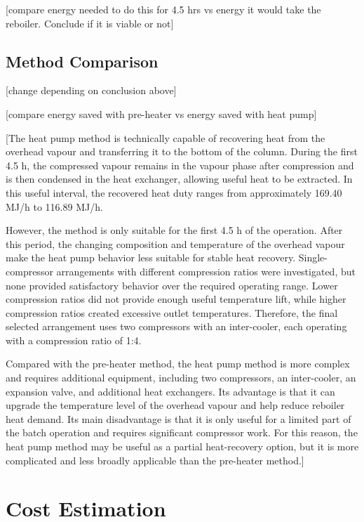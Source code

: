 {[}compare energy needed to do this for 4.5 hrs vs energy it would take
the reboiler. Conclude if it is viable or not{]}

\section{Method Comparison}\label{method-comparison}

{[}change depending on conclusion above{]}

{[}compare energy saved with pre-heater vs energy saved with heat
pump{]}

{[}The heat pump method is technically capable of recovering heat from
the overhead vapour and transferring it to the bottom of the column.
During the first 4.5 h, the compressed vapour remains in the vapour
phase after compression and is then condensed in the heat exchanger,
allowing useful heat to be extracted. In this useful interval, the
recovered heat duty ranges from approximately 169.40 MJ/h to 116.89
MJ/h.

However, the method is only suitable for the first 4.5 h of the
operation. After this period, the changing composition and temperature
of the overhead vapour make the heat pump behavior less suitable for
stable heat recovery. Single-compressor arrangements with different
compression ratios were investigated, but none provided satisfactory
behavior over the required operating range. Lower compression ratios did
not provide enough useful temperature lift, while higher compression
ratios created excessive outlet temperatures. Therefore, the final
selected arrangement uses two compressors with an inter-cooler, each
operating with a compression ratio of 1:4.

Compared with the pre-heater method, the heat pump method is more
complex and requires additional equipment, including two compressors, an
inter-cooler, an expansion valve, and additional heat exchangers. Its
advantage is that it can upgrade the temperature level of the overhead
vapour and help reduce reboiler heat demand. Its main disadvantage is
that it is only useful for a limited part of the batch operation and
requires significant compressor work. For this reason, the heat pump
method may be useful as a partial heat-recovery option, but it is more
complicated and less broadly applicable than the pre-heater method.{]}

\chapter{Cost Estimation}\label{cost-estimation}

